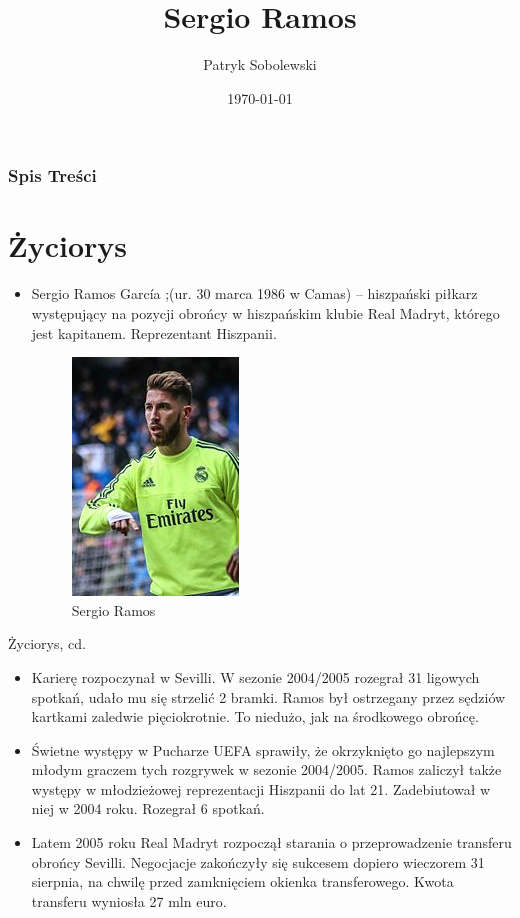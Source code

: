 \documentclass{beamer}
\title{Sergio Ramos}
\author{Patryk Sobolewski}
\institute{UWM}
\date{\today}
\begin{document}
\frame{\titlepage}



\begin{frame}
\frametitle{Spis Treści}
\tableofcontents
\end{frame}



\section{Życiorys}
\begin{frame}{}
\begin{itemize}
\item{Sergio Ramos García ;(ur. 30 marca 1986 w Camas) – hiszpański piłkarz występujący na pozycji obrońcy w hiszpańskim klubie Real Madryt, którego jest kapitanem. Reprezentant Hiszpanii.}
\begin{figure}
\includegraphics[width=0.25\hsize] {Sergio.jpg}
\caption{Sergio Ramos}\label{fig:Sergio}
\end{figure}
\end{itemize}
\end{frame}

\begin{frame}{Życiorys, cd.}
\begin{itemize}
\item<1>Karierę rozpoczynał w Sevilli. W sezonie 2004/2005 rozegrał 31 ligowych spotkań, udało mu się strzelić 2 bramki. Ramos był ostrzegany przez sędziów kartkami zaledwie pięciokrotnie. To niedużo, jak na środkowego obrońcę. 
\item<2>Świetne występy w Pucharze UEFA sprawiły, że okrzyknięto go najlepszym młodym graczem tych rozgrywek w sezonie 2004/2005. Ramos zaliczył także występy w młodzieżowej reprezentacji Hiszpanii do lat 21. Zadebiutował w niej w 2004 roku. Rozegrał 6 spotkań.
\item<3>Latem 2005 roku Real Madryt rozpoczął starania o przeprowadzenie transferu obrońcy Sevilli. Negocjacje zakończyły się sukcesem dopiero wieczorem 31 sierpnia, na chwilę przed zamknięciem okienka transferowego. Kwota transferu wyniosła 27 mln euro.
\end{itemize}
\end{frame}
\end{document}
